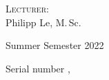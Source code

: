 \begin{titlepage}
\begin{center}
		\vspace{0.75cm}

		\normalsize
		\textsc{Lecturer:} \\
		Philipp Le, M.\,Sc.
		
		\vspace{0.75cm}
		
		\normalsize
		Summer Semester 2022
	\end{center}

	\vfill
	
	\begin{flushright}
		\footnotesize
		Serial number \VcsCommitNo, \VcsCommitDate
	\end{flushright}
\end{titlepage}
